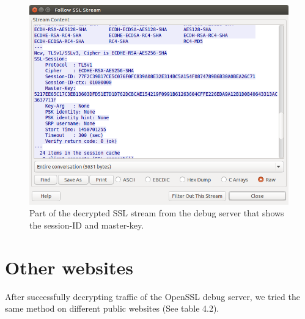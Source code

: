 \documentclass[12pt, a4paper]{report}
\begin{document}
\begin{figure}[h]
\centering
  \includegraphics[scale=0.5]{images/debug.png}
  \caption{Part of the decrypted SSL stream from the debug server that shows the session-ID and master-key.}
\end{figure}


\clearpage
\section{Other websites}

After successfully decrypting traffic of the OpenSSL debug server, we tried the same method on different public websites (See table 4.2). 
\end{document}
